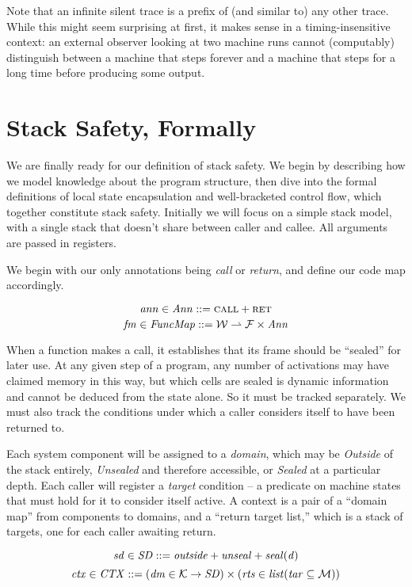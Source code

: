 \documentclass[acmsmall,review,anonymous]{acmart}\settopmatter{printfolios=true,printccs=false,printacmref=false}
\begin{document}
Note that an infinite silent trace is a
prefix of (and similar to) any other trace. While this might seem
surprising at first, it makes sense in a timing-insensitive context:
an external observer looking at two machine runs cannot (computably)
distinguish between a machine that steps forever and a machine that
steps for a long time before producing some output.

\section{Stack Safety, Formally}
\label{sec:lse}

We are finally ready for our definition of stack safety. We begin
by describing how we model knowledge about the program structure,
then dive into the formal definitions of local state encapsulation and
well-bracketed control flow, which together constitute stack safety.
Initially we will focus on a simple stack model, with a single stack
that doesn't share between caller and callee. All arguments are passed
in registers.

We begin with our only annotations being {\em call} or {\em return}, and
define our code map accordingly.

\[\mathit{ann} \in \mathit{Ann} ::= \text{\sc call} + \text{\sc ret}\]
\[\mathit{fm} \in \mathit{FuncMap} ::= {\mathcal W} \rightharpoonup \mathcal{F} \times \mathit{Ann}\]

When a function makes a call, it establishes that its frame should be
``sealed'' for later use. At any given step of a program, any number of
activations may have claimed memory in this way, but which cells are sealed
is dynamic information and cannot be deduced from the state alone. So it must
be tracked separately. We must also track the conditions under which a caller
considers itself to have been returned to.

Each system component will be assigned to a {\em domain}, which may be {\em Outside}
of the stack entirely, {\em Unsealed} and therefore accessible, or {\em Sealed}
at a particular depth. Each caller will register a {\em target} condition -- a
predicate on machine states that must hold for it to consider itself active.
A context is a pair of a ``domain map'' from components to domains, and a
``return target list,'' which is a stack of targets, one for each caller awaiting
return.  \ifaftersubmission{}\fi

\[\mathit{sd} \in \mathit{SD} ::= \mathit{outside} + \mathit{unseal} + \mathit{seal(d)}\]
\[\mathit{ctx} \in \mathit{CTX} ::= (\mathit{dm} \in {\mathcal K} \rightarrow \mathit{SD})
  \times (\mathit{rts} \in \mathit{list} (\mathit{tar} \subseteq {\mathcal M})) \]
\end{document}
